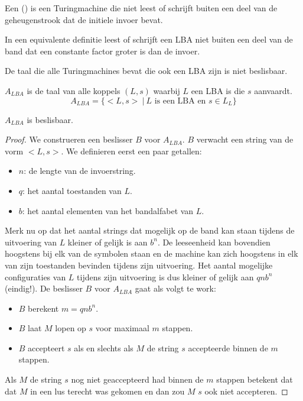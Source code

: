 \documentclass[main.tex]{subfiles}
\begin{document}
\begin{de}
  \label{de:linear-begrensde-automaat}
  Een  () is een Turingmachine die niet leest of schrijft buiten een deel van de geheugenstrook dat de initiele invoer bevat.
\end{de}

\begin{st}
  In een equivalente definitie leest of schrijft een LBA niet buiten een deel van de band dat een constante factor groter is dan de invoer.
\zb
\end{st}

\begin{st}
  De taal die alle Turingmachines bevat die ook een LBA zijn is niet beslisbaar.
\end{st}

\begin{de}
  \label{de:a-lba}
  $A_{LBA}$ is de taal van alle koppels $(L,s)$ waarbij $L$ een LBA is die $s$ aanvaardt.
  \[ A_{LBA} = \{ <L,s> \ |\ L \text{ is een LBA en } s \in L_{L}\} \]
\end{de}

\begin{st}
  \label{st:a-lba-is-besl}
  $A_{LBA}$ is beslisbaar.

  \begin{proof}
    We construeren een beslisser $B$ voor $A_{LBA}$.
    $B$ verwacht een string van de vorm $<L,s>$.
    We definieren eerst een paar getallen:
    \begin{itemize}
    \item $n$: de lengte van de invoerstring.
    \item $q$: het aantal toestanden van $L$.
    \item $b$: het aantal elementen van het bandalfabet van $L$.
    \end{itemize}
    Merk nu op dat het aantal strings dat mogelijk op de band kan staan tijdens de uitvoering van $L$ kleiner of gelijk is aan $b^{n}$.
    De leeseenheid kan bovendien hoogstens bij elk van de symbolen staan en de machine kan zich hoogstens in elk van zijn toestanden bevinden tijdens zijn uitvoering.
    Het aantal mogelijke configuraties van $L$ tijdens zijn uitvoering is dus kleiner of gelijk aan $qnb^{n}$ (eindig!).
    De beslisser $B$ voor $A_{LBA}$ gaat als volgt te work:
    \begin{itemize}
    \item $B$ berekent $m = qnb^{n}$.
    \item $B$ laat $M$ lopen op $s$ voor maximaal $m$ stappen.
    \item $B$ accepteert $s$ als en slechts als $M$ de string $s$ accepteerde binnen de $m$ stappen.
    \end{itemize}
    Als $M$ de string $s$ nog niet geaccepteerd had binnen de $m$ stappen betekent dat dat $M$ in een lus terecht was gekomen en dan zou $M$ $s$ ook niet accepteren.
  \end{proof}
\end{st}
\end{document}
